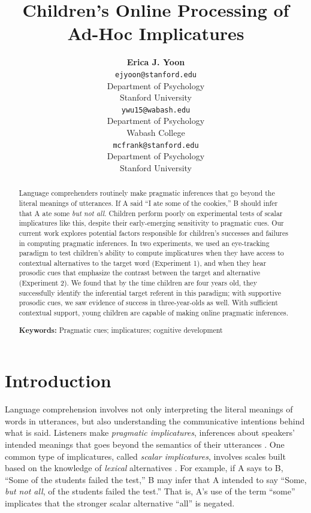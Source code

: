 \documentclass[10pt,letterpaper]{article}
\title{Children's Online Processing of Ad-Hoc Implicatures}
\author{{\large \bf Erica J. Yoon} \\
  \texttt{ejyoon@stanford.edu} \\
  Department of Psychology \\
  Stanford University
  \And {\large \bf Yunan Charles Wu} \\
  \texttt{ywu15@wabash.edu} \\
  Department of Psychology \\
  Wabash College
  \And {\large \bf Michael C. Frank} \\
  \texttt{mcfrank@stanford.edu} \\
  Department of Psychology \\
  Stanford University}
\begin{document}
\maketitle

\begin{abstract}
Language comprehenders routinely make pragmatic inferences that go beyond the literal meanings of utterances. If A said ``I ate some of the cookies,'' B should infer that A ate some \emph{but not all}. Children perform poorly on experimental tests of scalar implicatures like this, despite their early-emerging sensitivity to pragmatic cues. Our current work explores potential factors responsible for children's successes and failures in computing pragmatic inferences. In two experiments, we used an eye-tracking paradigm to test children's ability to compute implicatures when they have access to contextual alternatives to the target word (Experiment 1), and when they hear prosodic cues that emphasize the contrast between the target and alternative (Experiment 2). We found that by the time children are four years old, they successfully identify the inferential target referent in this paradigm; with supportive prosodic cues, we saw evidence of success in three-year-olds as well. With sufficient contextual support, young children are capable of making online pragmatic inferences.

\textbf{Keywords:} 
Pragmatic cues; implicatures; cognitive development

\end{abstract}

\section{Introduction}

Language comprehension involves not only interpreting the literal meanings of words in utterances, but also understanding the communicative intentions behind what is said. Listeners make \emph{pragmatic implicatures}, inferences about speakers' intended meanings that goes beyond the semantics of their utterances \cite{grice1975logic}. One common type of implicatures, called  \emph{scalar implicatures}, involves scales built based on the knowledge of \emph{lexical} alternatives \cite{horn1972}. For example, if A says to B, ``Some of the students failed the test,'' B may infer that A intended to say ``Some, \emph{but not all}, of the students failed the test.'' That is, A's use of the term ``some'' implicates that the stronger scalar alternative ``all'' is negated. 
\end{document}

